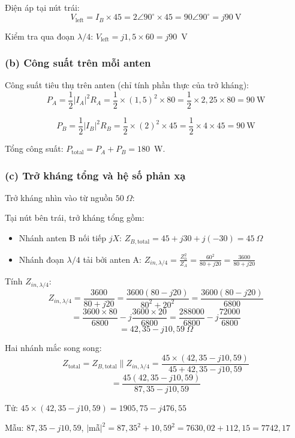 \documentclass[12pt,a4paper]{article}
\begin{document}
Điện áp tại nút trái:
\[
V_{\text{left}} = I_B \times 45 = 2\angle 90^\circ \times 45 = 90\angle 90^\circ = j90~\text{V}
\]

Kiểm tra qua đoạn $\lambda/4$: $V_{\text{left}} = j1{,}5 \times 60 = j90$~V \checkmark

\subsubsection{(b) Công suất trên mỗi anten}

Công suất tiêu thụ trên anten (chỉ tính phần thực của trở kháng):
\[
P_A = \frac{1}{2}|I_A|^2 R_A = \frac{1}{2} \times (1{,}5)^2 \times 80 = \frac{1}{2} \times 2{,}25 \times 80 = \boxed{90~\text{W}}
\]

\[
P_B = \frac{1}{2}|I_B|^2 R_B = \frac{1}{2} \times (2)^2 \times 45 = \frac{1}{2} \times 4 \times 45 = \boxed{90~\text{W}}
\]

Tổng công suất: $P_{\text{total}} = P_A + P_B = 180$~W.

\subsubsection{(c) Trở kháng tổng và hệ số phản xạ}

Trở kháng nhìn vào từ nguồn $50~\Omega$:

Tại nút bên trái, trở kháng tổng gồm:
\begin{itemize}
    \item Nhánh anten B nối tiếp $jX$: $Z_{B,\text{total}} = 45 + j30 + j(-30) = 45~\Omega$
    \item Nhánh đoạn $\lambda/4$ tải bởi anten A: $Z_{in,\lambda/4} = \frac{Z_0^2}{Z_A} = \frac{60^2}{80 + j20} = \frac{3600}{80 + j20}$
\end{itemize}

Tính $Z_{in,\lambda/4}$:
\[
Z_{in,\lambda/4} = \frac{3600}{80 + j20} = \frac{3600(80 - j20)}{80^2 + 20^2} = \frac{3600(80 - j20)}{6800}
\]
\[
= \frac{3600 \times 80}{6800} - j\frac{3600 \times 20}{6800} = \frac{288000}{6800} - j\frac{72000}{6800}
\]
\[
= 42{,}35 - j10{,}59~\Omega
\]

Hai nhánh mắc song song:
\[
Z_{\text{total}} = Z_{B,\text{total}} \| Z_{in,\lambda/4} = \frac{45 \times (42{,}35 - j10{,}59)}{45 + 42{,}35 - j10{,}59}
\]
\[
= \frac{45(42{,}35 - j10{,}59)}{87{,}35 - j10{,}59}
\]

Tử: $45 \times (42{,}35 - j10{,}59) = 1905{,}75 - j476{,}55$

Mẫu: $87{,}35 - j10{,}59$, $|$mẫ$|^2 = 87{,}35^2 + 10{,}59^2 = 7630{,}02 + 112{,}15 = 7742{,}17$
\end{document}
